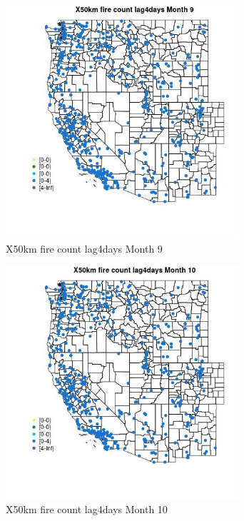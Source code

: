 \begin{figure} 
\centering  
\includegraphics[width=0.77\textwidth]{Code_Outputs/Report_ML_input_PM25_Step4_part_e_de_duplicated_aves_compiled_2019-05-14wNAs_MapObsMo9X50km_fire_count_lag4days.jpg} 
\caption{\label{fig:Report_ML_input_PM25_Step4_part_e_de_duplicated_aves_compiled_2019-05-14wNAsMapObsMo9X50km_fire_count_lag4days}X50km fire count lag4days Month 9} 
\end{figure} 
 

\begin{figure} 
\centering  
\includegraphics[width=0.77\textwidth]{Code_Outputs/Report_ML_input_PM25_Step4_part_e_de_duplicated_aves_compiled_2019-05-14wNAs_MapObsMo10X50km_fire_count_lag4days.jpg} 
\caption{\label{fig:Report_ML_input_PM25_Step4_part_e_de_duplicated_aves_compiled_2019-05-14wNAsMapObsMo10X50km_fire_count_lag4days}X50km fire count lag4days Month 10} 
\end{figure} 
 

